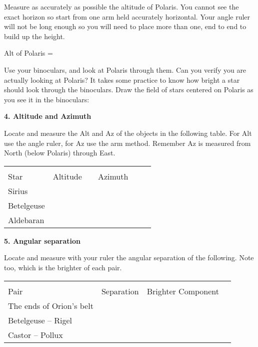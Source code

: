 \noindent Measure as accurately as possible the altitude of Polaris. You cannot
see the exact horizon so start from one arm held accurately
horizontal. Your angle ruler will not be long enough so you will need to
place more than one, end to end to build up the height.

\bigskip
{\hfill Alt of Polaris = \makebox[4cm]{\hrulefill} \hfill}

\clearpage

\noindent Use your binoculars, and look at Polaris through them. Can you verify
you are actually looking at Polaris?  It takes some practice to know
how bright a star should look through the binoculars. Draw the field
of stars centered on Polaris as you see it in the binoculars:

\centerline{}


\bigskip\noindent
{\bf 4. Altitude and Azimuth}

\bigskip\noindent
Locate and measure the Alt and Az of the objects in the following
table. For Alt use the angle ruler, for Az use the arm
method. Remember Az is measured from North (below Polaris) through East.

\begin{center}
\begin{tabular}{lcc} \hline \\ [-6pt]
Star   &\hspace{1.5cm} Altitude \hspace{1.5cm} & \ \ Azimuth \ \ \ \
 \\ [6pt]  \hline
Sirius    &   &        \\ \hline
Betelgeuse    &   &       \\ \hline
Aldebaran    &   &       \\  \hline
\end{tabular}
\end{center}

\bigskip\noindent
{\bf 5. Angular separation}

\bigskip\noindent
Locate and measure with your ruler the angular separation of the following.
Note too, which is the brighter of each pair.

\begin{center}
\begin{tabular}{lccc} \hline \\ [-6pt]
Pair   & \hspace{1cm} Separation \hspace{1cm}& Brighter Component \\ [6pt]
\hline
The ends of Orion's belt      & &        \\ \hline
Betelgeuse -- Rigel     & &       \\ \hline
Castor -- Pollux       & &       \\ \hline
\end{tabular}
\end{center}

